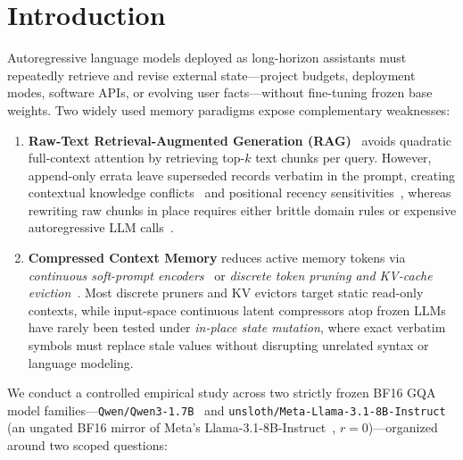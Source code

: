 \documentclass[10pt]{article}
\renewcommand{\_}{\origunderscore\allowbreak}
\begin{document}
\section{Introduction}
\label{sec:intro}

Autoregressive language models deployed as long-horizon assistants must repeatedly retrieve and revise external state---project budgets, deployment modes, software APIs, or evolving user facts---without fine-tuning frozen base weights. Two widely used memory paradigms expose complementary weaknesses:

\begin{enumerate}
    \item \textbf{Raw-Text Retrieval-Augmented Generation (RAG)}~\citep{lewis2020rag,robertson2009bm25,xiao2024bge} avoids quadratic full-context attention by retrieving top-$k$ text chunks per query. However, append-only errata leave superseded records verbatim in the prompt, creating contextual knowledge conflicts~\citep{longpre2021conflict} and positional recency sensitivities~\citep{liu2024lost}, whereas rewriting raw chunks in place requires either brittle domain rules or expensive autoregressive LLM calls~\citep{packer2023memgpt,chhikara2025mem0}.
    \item \textbf{Compressed Context Memory} reduces active memory tokens via \emph{continuous soft-prompt encoders}~\citep{mu2023gist,chevalier2023autocompressors,ge2024icae,cheng2024xrag,li2025compressor500x,fallahpour2026memorilla} or \emph{discrete token pruning and KV-cache eviction}~\citep{pan2024llmlingua2,chirkova2025provence,zhang2023h2o,li2024snapkv}. Most discrete pruners and KV evictors target static read-only contexts, while input-space continuous latent compressors atop frozen LLMs have rarely been tested under \emph{in-place state mutation}, where exact verbatim symbols must replace stale values without disrupting unrelated syntax or language modeling.
\end{enumerate}

We conduct a controlled empirical study across two strictly frozen BF16 GQA model families---\texttt{Qwen/Qwen3-1.7B}~\citep{yang2025qwen3} and \texttt{unsloth/Meta-Llama-3.1-8B-Instruct} (an ungated BF16 mirror of Meta's Llama-3.1-8B-Instruct~\citep{dubey2024llama3}, $r=0$)---organized around two scoped questions:
\end{document}
